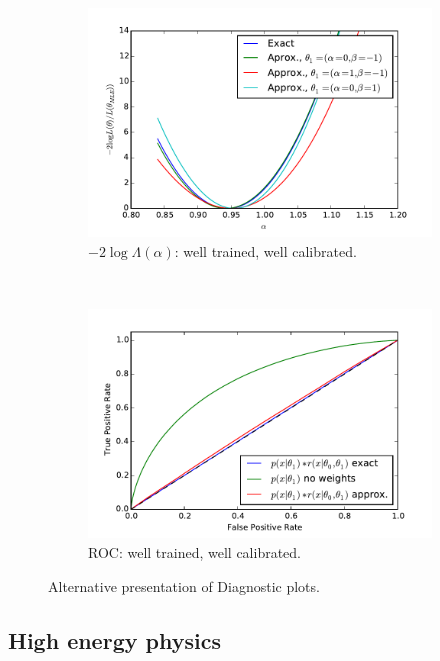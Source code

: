 \documentclass[12pt]{article}
\numberwithin{equation}{section}
\theoremstyle{plain}
\begin{document}
\begin{figure}
    \begin{subfigure}[t]{0.4\textwidth}
        \centering
        \includegraphics[width=\textwidth]{figures/likelihood_comp_2.pdf}
        \caption{$-2\log \Lambda(\alpha)$: well trained, well calibrated. }
        \label{fig:6e}
    \end{subfigure}
    ~
    \begin{subfigure}[t]{0.4\textwidth}
        \centering
        \includegraphics[width=\textwidth]{figures/ROC_comp2.pdf}
        \caption{ROC: well trained, well calibrated. }
        \label{fig:6f}
    \end{subfigure}

    \caption{Alternative presentation of Diagnostic plots.}
    \label{fig:diagnostics}
\end{figure}


\subsection{High energy physics}
\end{document}

